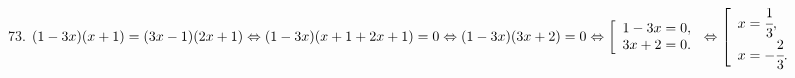73. $(1-3x)(x+1)=(3x-1)(2x+1)\Leftrightarrow (1-3x)(x+1+2x+1)=0\Leftrightarrow(1-3x)(3x+2)=0\Leftrightarrow
\left[\begin{array}{l}1-3x=0,\\ 3x+2=0.\end{array}\right.\Leftrightarrow
\left[\begin{array}{l}x=\cfrac{1}{3},\\ x=-\cfrac{2}{3}.\end{array}\right.$\\

